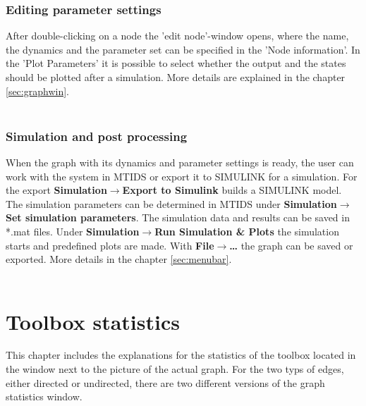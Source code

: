 \documentclass[12pt]{report}
\begin{document}
\subsection{Editing parameter settings}
After double-clicking on a node the 'edit node'-window opens, where the name, the dynamics and the parameter set can be specified in the 'Node information'. In the 'Plot Parameters' it is possible to select whether the output and the states should be plotted after a simulation. More details are explained in the chapter \ref{sec:graphwin}.\\
\\
\subsection{Simulation and post processing}
When the graph with its dynamics and parameter settings is ready, the user can work with the system in MTIDS or export it to SIMULINK for a simulation. For the export \textbf{Simulation$\rightarrow$Export to Simulink} builds a SIMULINK model. The simulation parameters can be determined in MTIDS under \textbf{Simulation$\rightarrow$Set simulation parameters}. The simulation data and results can be saved in *.mat files. Under \textbf{Simulation$\rightarrow$Run Simulation \& Plots} the simulation starts and predefined plots are made. With \textbf{File$\rightarrow$\dots} the graph can be saved or exported. More details in the chapter \ref{sec:menubar}.\\
\\
\chapter{Toolbox statistics}
\label{chap:toolbox}
This chapter includes the explanations for the statistics of the toolbox located in the window next to the picture of the actual graph. For the two typs of edges, either directed or undirected, there are two different versions of the graph statistics window.
\\
\end{document}
